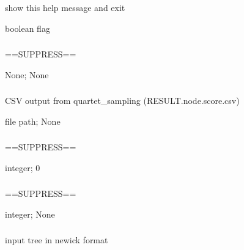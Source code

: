 \documentclass[letterpaper,12pt,english]{sphinxmanual}
\begin{document}
\subsubsection{}
\label{\detokenize{prog_desc:id9}}
 show this help message and exit

 boolean flag


\subsubsection{}
\label{\detokenize{prog_desc:id10}}
 ==SUPPRESS==

 None;  None


\subsubsection{}
\label{\detokenize{prog_desc:data}}
 CSV output from quartet\_sampling (RESULT.node.score.csv)

 file path;  None


\subsubsection{}
\label{\detokenize{prog_desc:id11}}
 ==SUPPRESS==

 integer;  0


\subsubsection{}
\label{\detokenize{prog_desc:id12}}
 ==SUPPRESS==

 integer;  None


\subsubsection{}
\label{\detokenize{prog_desc:tree}}
 input tree in newick format
\end{document}
